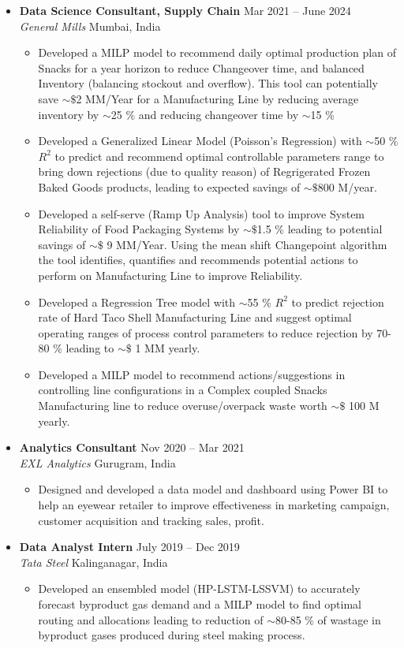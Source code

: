 \documentclass[a4paper,10pt]{article}
\newcommand{\resumeItem}[1]{\item\small{#1}}
\newcommand{\resumeSubheading}[4]{
  \vspace{1pt}\item
    \textbf{#1} \hfill {#2} \\
    \emph{#3} \hfill {#4} \\
}
\begin{document}
\begin{itemize}
    \resumeSubheading
      {Data Science Consultant, Supply Chain}{Mar 2021 -- June 2024}
      {General Mills}{Mumbai, India}
      \begin{itemize}
          \resumeItem{
            Developed a MILP model to recommend daily optimal production plan of Snacks for a year horizon to reduce Changeover time, 
            and balanced Inventory (balancing stockout and overflow). This tool can potentially save $\sim\$$2 MM/Year for a 
            Manufacturing Line by reducing average inventory by $\sim$25 \%
            and reducing changeover time by $\sim$15 \%
          }
          \resumeItem{
            Developed a Generalized Linear Model (Poisson's Regression) with $\sim$50 \% $R^2$ to predict and recommend optimal controllable 
            parameters range to bring down rejections (due to quality reason) of Regrigerated Frozen Baked Goods products, leading to expected 
            savings of $\sim\$$800 M/year. 
          }
          \resumeItem{
            Developed  a self-serve (Ramp Up Analysis) tool to improve System Reliability of Food Packaging Systems by
            $\sim\$$1.5 \% leading to potential savings of $\sim\$$ 9 MM/Year. Using the mean shift Changepoint algorithm the tool identifies,
            quantifies and recommends potential actions to perform on Manufacturing Line to improve Reliability.
          }
          \resumeItem{
            Developed a Regression Tree model with $\sim$55 \% $R^2$ to predict rejection rate of Hard Taco Shell Manufacturing Line and suggest
            optimal operating ranges of process control parameters to reduce rejection by 70-80 \% leading to $\sim\$$ 1 MM
            yearly.
          }
          \resumeItem{
            Developed a MILP model to recommend actions/suggestions in controlling line configurations in a Complex coupled
            Snacks Manufacturing line to reduce overuse/overpack waste worth $\sim\$$ 100 M yearly.
          }
      \end{itemize}
    
    \resumeSubheading
      {Analytics Consultant}{Nov 2020 -- Mar 2021}
      {EXL Analytics}{Gurugram, India}
      \begin{itemize}
          \resumeItem{
            Designed and developed a data model and dashboard using Power BI to help an eyewear retailer to improve 
            effectiveness in marketing campaign, customer acquisition and tracking sales, profit.
          }
      \end{itemize}

    \resumeSubheading
      {Data Analyst Intern}{July 2019 -- Dec 2019}
      {Tata Steel}{Kalinganagar, India}
      \begin{itemize}
          \resumeItem{
            Developed an ensembled model (HP-LSTM-LSSVM) to accurately forecast byproduct gas demand and a MILP model to find optimal 
            routing and allocations leading to reduction of $\sim$80-85 \% of wastage in byproduct gases produced during 
            steel making process.
          }
      \end{itemize}
\end{itemize}
\end{document}

